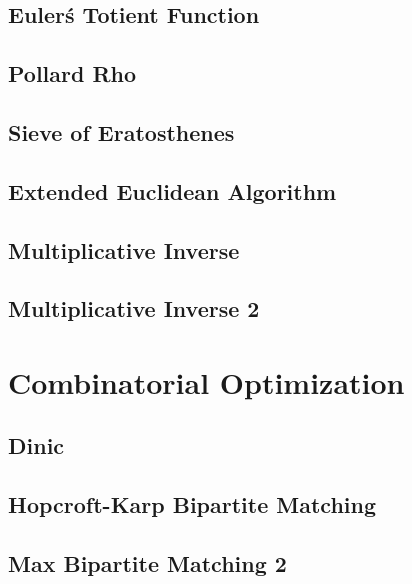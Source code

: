 \subsection{Euler\'s Totient Function}
\raggedbottom
\hrulefill
\subsection{Pollard Rho}
\raggedbottom
\hrulefill
\subsection{Sieve of Eratosthenes}
\raggedbottom
\hrulefill
\subsection{Extended Euclidean Algorithm}
\raggedbottom
\hrulefill
\subsection{Multiplicative Inverse}
\raggedbottom
\hrulefill
\subsection{Multiplicative Inverse 2}
\raggedbottom
\hrulefill

\section{Combinatorial Optimization}
\subsection{Dinic}
\raggedbottom
\hrulefill
\subsection{Hopcroft-Karp Bipartite Matching}
\raggedbottom
\hrulefill
\subsection{Max Bipartite Matching 2}
\raggedbottom
\hrulefill
